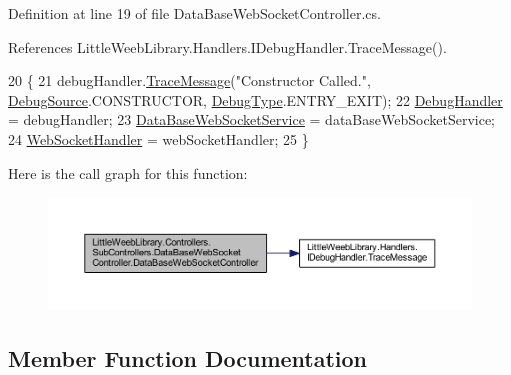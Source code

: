 Definition at line 19 of file Data\+Base\+Web\+Socket\+Controller.\+cs.



References Little\+Weeb\+Library.\+Handlers.\+I\+Debug\+Handler.\+Trace\+Message().


\begin{DoxyCode}
20         \{
21             debugHandler.\mbox{\hyperlink{interface_little_weeb_library_1_1_handlers_1_1_i_debug_handler_a2e405bc3492e683cd3702fae125221bc}{TraceMessage}}(\textcolor{stringliteral}{"Constructor Called."}, 
      \mbox{\hyperlink{namespace_little_weeb_library_1_1_handlers_a2a6ca0775121c9c503d58aa254d292be}{DebugSource}}.CONSTRUCTOR, \mbox{\hyperlink{namespace_little_weeb_library_1_1_handlers_ab66019ed40462876ec4e61bb3ccb0a62}{DebugType}}.ENTRY\_EXIT);
22             \mbox{\hyperlink{class_little_weeb_library_1_1_handlers_1_1_debug_handler}{DebugHandler}} = debugHandler;
23             \mbox{\hyperlink{class_little_weeb_library_1_1_services_1_1_data_base_web_socket_service}{DataBaseWebSocketService}} = dataBaseWebSocketService;
24             \mbox{\hyperlink{class_little_weeb_library_1_1_handlers_1_1_web_socket_handler}{WebSocketHandler}} = webSocketHandler;
25         \}
\end{DoxyCode}
Here is the call graph for this function\+:\nopagebreak
\begin{figure}[H]
\begin{center}
\leavevmode
\includegraphics[width=350pt]{class_little_weeb_library_1_1_controllers_1_1_sub_controllers_1_1_data_base_web_socket_controller_ac8f85473ad0ccabfa985d704343a49a7_cgraph}
\end{center}
\end{figure}


\subsection{Member Function Documentation}
\mbox{\label{class_little_weeb_library_1_1_controllers_1_1_sub_controllers_1_1_data_base_web_socket_controller_a655abc0c42c54c9ff3572e4b4271fa3b}} 
